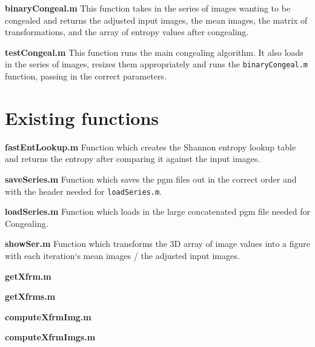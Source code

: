 \noindent \textbf{binaryCongeal.m}
This function takes in the series of images wanting to be congealed and returns the adjusted input images, the mean images, the matrix of transformations, and the array of entropy values after congealing.

\noindent \textbf{testCongeal.m}
This function runs the main congealing algorithm. It also loads in the series of images, resizes them appropriately and runs the \texttt{binaryCongeal.m} function, passing in the correct parameters.

\section{Existing functions}

\noindent \textbf{fastEntLookup.m}
Function which creates the Shannon entropy lookup table and returns the entropy after comparing it against the input images.

\noindent \textbf{saveSeries.m}
Function which saves the pgm files out in the correct order and with the header needed for \texttt{loadSeries.m}.

\noindent \textbf{loadSeries.m}
Function which loads in the large concatenated pgm file needed for Congealing.

\noindent \textbf{showSer.m}
Function which transforms the 3D array of image values into a figure with each iteration`s mean images / the adjusted input images.

\noindent \textbf{getXfrm.m}

\noindent \textbf{getXfrms.m}

\noindent \textbf{computeXfrmImg.m}

\noindent \textbf{computeXfrmImgs.m}

